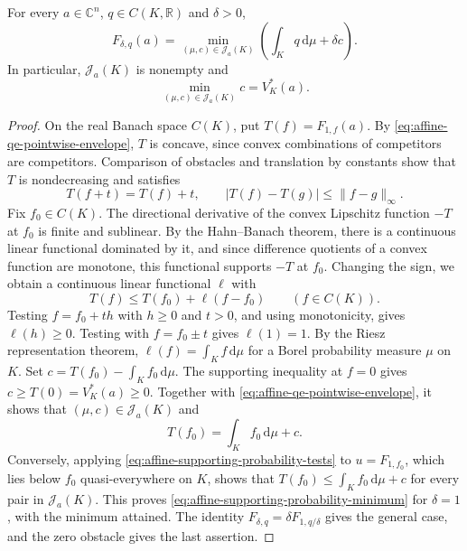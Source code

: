 \begin{theorem}\label{thm:affine-supporting-probabilities}
For every $a\in\mathbb C^n$, $q\in C(K,\mathbb R)$ and $\delta>0$,
\begin{equation}\label{eq:affine-supporting-probability-minimum}
 F_{\delta,q}(a)=\min_{(\mu,c)\in\mathcal J_a(K)}
             \left(\int_K q\,\mathrm{d}\mu+\delta c\right).
\end{equation}
In particular, $\mathcal J_a(K)$ is nonempty and
\[
 \min_{(\mu,c)\in\mathcal J_a(K)}c=V_K^*(a).
\]
\end{theorem}
\begin{proof}
On the real Banach space $C(K)$, put $T(f)=F_{1,f}(a)$. By \eqref{eq:affine-qe-pointwise-envelope}, $T$ is concave, since convex combinations of competitors are competitors. Comparison of obstacles and translation by constants show that $T$ is nondecreasing and satisfies
\[
 T(f+t)=T(f)+t,\qquad |T(f)-T(g)|\leq\|f-g\|_\infty.
\]
Fix $f_0\in C(K)$. The directional derivative of the convex Lipschitz function $-T$ at $f_0$ is finite and sublinear. By the Hahn--Banach theorem, there is a continuous linear functional dominated by it, and since difference quotients of a convex function are monotone, this functional supports $-T$ at $f_0$. Changing the sign, we obtain a continuous linear functional $\ell$ with
\[
 T(f)\leq T(f_0)+\ell(f-f_0)\qquad(f\in C(K)).
\]
Testing $f=f_0+th$ with $h\geq0$ and $t>0$, and using monotonicity, gives $\ell(h)\geq0$. Testing with $f=f_0\pm t$ gives $\ell(1)=1$. By the Riesz representation theorem, $\ell(f)=\int_K f\,\mathrm{d}\mu$ for a Borel probability measure $\mu$ on $K$. Set $c=T(f_0)-\int_K f_0\,\mathrm{d}\mu$. The supporting inequality at $f=0$ gives $c\geq T(0)=V_K^*(a)\geq0$. Together with \eqref{eq:affine-qe-pointwise-envelope}, it shows that $(\mu,c)\in\mathcal J_a(K)$ and
\[
 T(f_0)=\int_K f_0\,\mathrm{d}\mu+c.
\]
Conversely, applying \eqref{eq:affine-supporting-probability-tests} to $u=F_{1,f_0}$, which lies below $f_0$ quasi-everywhere on $K$, shows that $T(f_0)\leq\int_Kf_0\,\mathrm{d}\mu+c$ for every pair in $\mathcal J_a(K)$. This proves \eqref{eq:affine-supporting-probability-minimum} for $\delta=1$, with the minimum attained. The identity $F_{\delta,q}=\delta F_{1,q/\delta}$ gives the general case, and the zero obstacle gives the last assertion.
\end{proof}


